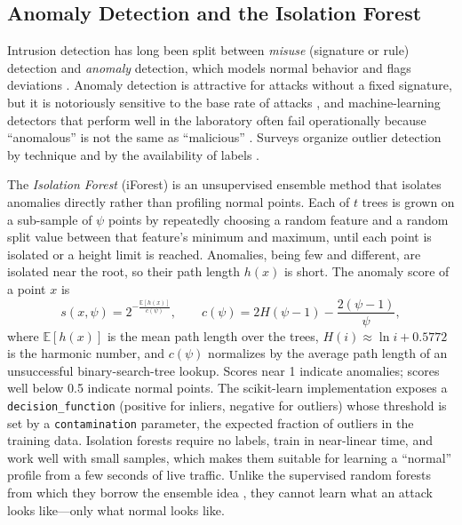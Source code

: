 \subsection{Anomaly Detection and the Isolation Forest}
\label{sec:bg-iforest}
Intrusion detection has long been split between \emph{misuse} (signature or rule)
detection and \emph{anomaly} detection, which models normal behavior and flags
deviations \cite{denning1987}. Anomaly detection is attractive for attacks without a
fixed signature, but it is notoriously sensitive to the base rate of attacks
\cite{axelsson2000}, and machine-learning detectors that perform well in the
laboratory often fail operationally because ``anomalous'' is not the same as
``malicious'' \cite{sommer2010}. Surveys organize outlier detection by technique and
by the availability of labels \cite{chandola2009,hodge2004}.

The \emph{Isolation Forest} (iForest) \cite{liu2008,liu2012} is an unsupervised
ensemble method that isolates anomalies directly rather than profiling normal points.
Each of $t$ trees is grown on a sub-sample of $\psi$ points by repeatedly choosing a
random feature and a random split value between that feature's minimum and maximum,
until each point is isolated or a height limit is reached. Anomalies, being few and
different, are isolated near the root, so their path length $h(x)$ is short. The
anomaly score of a point $x$ is
\begin{equation}
s(x,\psi) = 2^{-\frac{\mathbb{E}[h(x)]}{c(\psi)}}, \qquad
c(\psi) = 2H(\psi-1) - \frac{2(\psi-1)}{\psi},
\label{eq:iforest}
\end{equation}
where $\mathbb{E}[h(x)]$ is the mean path length over the trees, $H(i)\approx\ln i +
0.5772$ is the harmonic number, and $c(\psi)$ normalizes by the average path length of
an unsuccessful binary-search-tree lookup. Scores near 1 indicate anomalies; scores
well below 0.5 indicate normal points. The scikit-learn implementation
\cite{pedregosa2011} exposes a \texttt{decision\_function} (positive for inliers,
negative for outliers) whose threshold is set by a \texttt{contamination} parameter,
the expected fraction of outliers in the training data. Isolation forests require no
labels, train in near-linear time, and work well with small samples, which makes them
suitable for learning a ``normal'' profile from a few seconds of live traffic. Unlike
the supervised random forests from which they borrow the ensemble idea
\cite{breiman2001}, they cannot learn what an attack looks like---only what normal
looks like.

